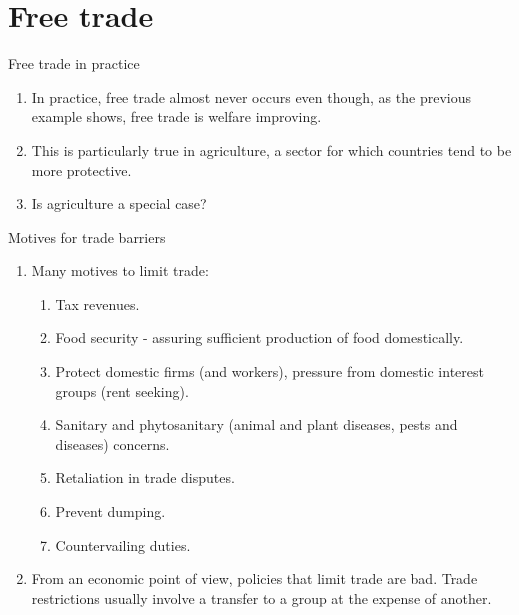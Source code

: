 \documentclass[table,xcolor=pdftex,dvipsnames]{beamer}\usepackage[]{graphicx}\usepackage[]{color}
\begin{document}
\section{Free trade}

\begin{frame}{Free trade in practice}
\begin{enumerate}[label=\textbullet]
    \item In practice, free trade almost never occurs even though, as the previous example shows, free trade is welfare improving.
    \item This is particularly true in agriculture, a sector for which countries tend to be more protective.
    \item Is agriculture a special case?
\end{enumerate}
\end{frame}


\begin{frame}{Motives for trade barriers}
\begin{enumerate}[label=\textbullet]
    \item Many motives to limit trade:
    \begin{enumerate}[label=\roman*)]
        \item Tax revenues.
        \item Food security - assuring sufficient production of food domestically.
        \item Protect domestic firms (and workers), pressure from domestic interest groups (rent seeking).
        \item Sanitary and phytosanitary (animal and plant diseases, pests and diseases) concerns.
        \item Retaliation in trade disputes.
        \item Prevent dumping.
        \item Countervailing duties.
    \end{enumerate}
    \item From an economic point of view, policies that limit trade are bad. Trade restrictions usually involve a transfer to a group at the expense of another.
\end{enumerate}
\end{frame}

\end{document}
